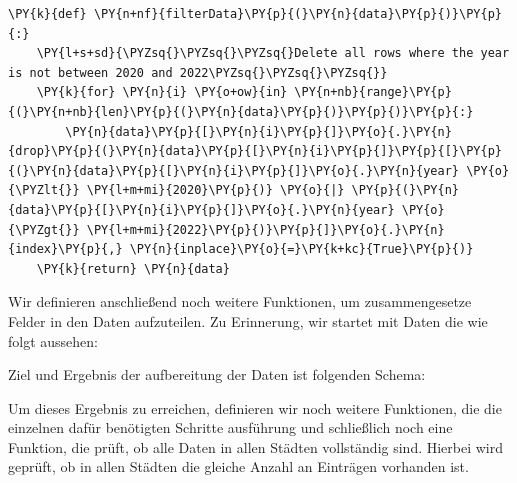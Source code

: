 \bigbreak
\begin{tcolorbox}[breakable, size=fbox, boxrule=1pt, pad at break*=1mm,colback=cellbackground, colframe=cellborder]
\begin{Verbatim}[commandchars=\\\{\}]
\PY{k}{def} \PY{n+nf}{filterData}\PY{p}{(}\PY{n}{data}\PY{p}{)}\PY{p}{:}
    \PY{l+s+sd}{\PYZsq{}\PYZsq{}\PYZsq{}Delete all rows where the year is not between 2020 and 2022\PYZsq{}\PYZsq{}\PYZsq{}}
    \PY{k}{for} \PY{n}{i} \PY{o+ow}{in} \PY{n+nb}{range}\PY{p}{(}\PY{n+nb}{len}\PY{p}{(}\PY{n}{data}\PY{p}{)}\PY{p}{)}\PY{p}{:}
        \PY{n}{data}\PY{p}{[}\PY{n}{i}\PY{p}{]}\PY{o}{.}\PY{n}{drop}\PY{p}{(}\PY{n}{data}\PY{p}{[}\PY{n}{i}\PY{p}{]}\PY{p}{[}\PY{p}{(}\PY{n}{data}\PY{p}{[}\PY{n}{i}\PY{p}{]}\PY{o}{.}\PY{n}{year} \PY{o}{\PYZlt{}} \PY{l+m+mi}{2020}\PY{p}{)} \PY{o}{|} \PY{p}{(}\PY{n}{data}\PY{p}{[}\PY{n}{i}\PY{p}{]}\PY{o}{.}\PY{n}{year} \PY{o}{\PYZgt{}} \PY{l+m+mi}{2022}\PY{p}{)}\PY{p}{]}\PY{o}{.}\PY{n}{index}\PY{p}{,} \PY{n}{inplace}\PY{o}{=}\PY{k+kc}{True}\PY{p}{)}
    \PY{k}{return} \PY{n}{data}
\end{Verbatim}
\end{tcolorbox}
\bigbreak

Wir definieren anschließend noch weitere Funktionen, um zusammengesetze Felder in den Daten aufzuteilen. Zu Erinnerung, wir startet mit Daten die wie folgt aussehen:
\begin{table}[h!]
\end{table}

Ziel und Ergebnis der aufbereitung der Daten ist folgenden Schema:
\begin{table}[h!]
\end{table}

Um dieses Ergebnis zu erreichen, definieren wir noch weitere Funktionen, die die einzelnen dafür benötigten Schritte ausführung und schließlich noch eine Funktion, die prüft, ob alle Daten in allen Städten vollständig sind. Hierbei wird geprüft, ob in allen Städten die gleiche Anzahl an Einträgen vorhanden ist.

